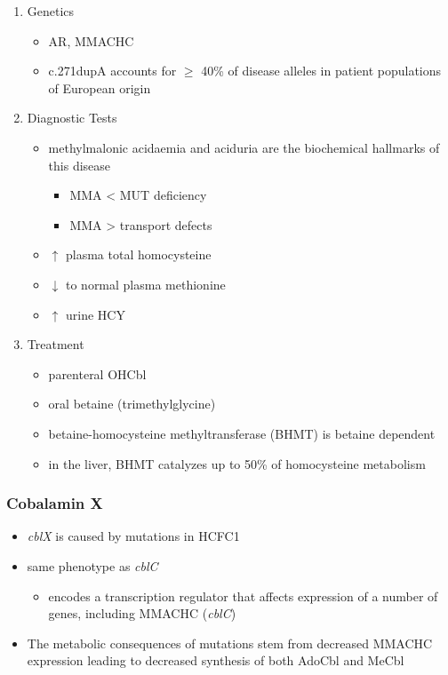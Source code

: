 \documentclass{scrartcl}
\begin{document}
\begin{enumerate}
\item Genetics
\label{sec:orgb31f662}
\begin{itemize}
\item AR, MMACHC
\item c.271dupA accounts for \(\ge\) 40\% of disease alleles in patient
populations of European origin
\end{itemize}

\item Diagnostic Tests
\label{sec:orgf2b9d39}
\begin{itemize}
\item methylmalonic acidaemia and aciduria are the
biochemical hallmarks of this disease
\begin{itemize}
\item MMA \textless{} MUT deficiency
\item MMA \textgreater{} transport defects
\end{itemize}
\item \(\uparrow\) plasma total homocysteine
\item \(\downarrow\) to normal plasma methionine
\item \(\uparrow\) urine HCY
\end{itemize}

\item Treatment
\label{sec:orgbf1e14d}
\begin{itemize}
\item parenteral OHCbl
\item oral betaine (trimethylglycine)
\item betaine-homocysteine methyltransferase (BHMT) is betaine dependent
\end{itemize}
\begin{itemize}
\item in the liver, BHMT catalyzes up to 50\% of homocysteine metabolism
\end{itemize}
\end{enumerate}
\subsubsection{Cobalamin X}
\label{sec:org8890fab}
\begin{itemize}
\item \emph{cblX} is caused by mutations in HCFC1
\item same phenotype as \emph{cblC}
\begin{itemize}
\item encodes a transcription regulator that affects expression of a
number of genes, including MMACHC (\emph{cblC})
\end{itemize}
\item The metabolic consequences of mutations stem from decreased MMACHC
expression leading to decreased synthesis of both AdoCbl and MeCbl
\end{itemize}
\end{document}
